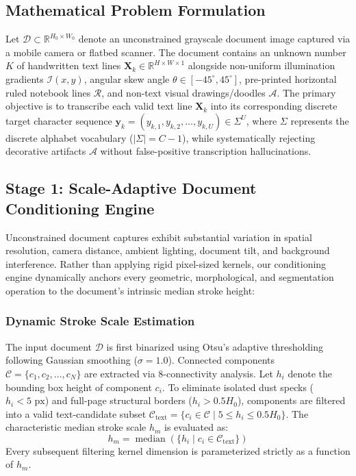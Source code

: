 \documentclass{IEEEtran}
\begin{document}
\label{sec:methodology}

\subsection{Mathematical Problem Formulation}

Let $\mathcal{D} \subset \mathbb{R}^{H_0 \times W_0}$ denote an unconstrained grayscale document image captured via a mobile camera or flatbed scanner. The document contains an unknown number $K$ of handwritten text lines $\mathbf{X}_k \in \mathbb{R}^{H \times W \times 1}$ alongside non-uniform illumination gradients $\mathcal{I}(x, y)$, angular skew angle $\theta \in [-45^\circ, 45^\circ]$, pre-printed horizontal ruled notebook lines $\mathcal{R}$, and non-text visual drawings/doodles $\mathcal{A}$. The primary objective is to transcribe each valid text line $\mathbf{X}_k$ into its corresponding discrete target character sequence $\mathbf{y}_k = (y_{k,1}, y_{k,2}, \ldots, y_{k,U}) \in \Sigma^U$, where $\Sigma$ represents the discrete alphabet vocabulary ($|\Sigma| = C - 1$), while systematically rejecting decorative artifacts $\mathcal{A}$ without false-positive transcription hallucinations.

\subsection{Stage 1: Scale-Adaptive Document Conditioning Engine}

Unconstrained document captures exhibit substantial variation in spatial resolution, camera distance, ambient lighting, document tilt, and background interference. Rather than applying rigid pixel-sized kernels, our conditioning engine dynamically anchors every geometric, morphological, and segmentation operation to the document's intrinsic median stroke height:

\subsubsection{Dynamic Stroke Scale Estimation}

The input document $\mathcal{D}$ is first binarized using Otsu's adaptive thresholding~\cite{otsu1979} following Gaussian smoothing ($\sigma=1.0$). Connected components $\mathcal{C} = \{c_1, c_2, \ldots, c_N\}$ are extracted via 8-connectivity analysis. Let $h_i$ denote the bounding box height of component $c_i$. To eliminate isolated dust specks ($h_i < 5\text{ px}$) and full-page structural borders ($h_i > 0.5 H_0$), components are filtered into a valid text-candidate subset $\mathcal{C}_{\text{text}} = \{c_i \in \mathcal{C} \mid 5 \le h_i \le 0.5 H_0\}$. The characteristic median stroke scale $h_m$ is evaluated as:
\begin{equation}
h_m = \operatorname{median}\left(\{h_i \mid c_i \in \mathcal{C}_{\text{text}}\}\right)
\label{eq:med_h}
\end{equation}
\noindent Every subsequent filtering kernel dimension is parameterized strictly as a function of $h_m$.
\end{document}
